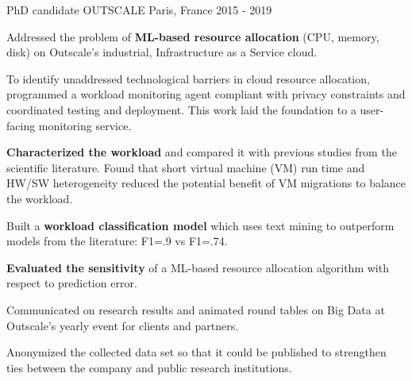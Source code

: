 
\begin{cventries}
  \cventry
  {PhD candidate} 
  {OUTSCALE}
  {Paris, France} %
  {2015 - 2019} %
    {
      \begin{cvitems} %
      \item {Addressed the problem of \textbf{ML-based resource allocation} (CPU, memory, disk) on Outscale's industrial, Infrastructure as a Service cloud.}
      \item{To identify unaddressed technological barriers in cloud resource allocation, programmed a workload monitoring agent compliant with privacy constraints and coordinated testing and deployment. This work laid the foundation to a user-facing monitoring service.}
      \item{\textbf{Characterized the workload} and compared it with previous studies from the scientific literature. Found that short virtual machine (VM) run time and HW/SW heterogeneity reduced the potential benefit of VM migrations to balance the workload.}
      \item{Built a \textbf{workload classification model} which uses text mining to outperform models from the literature: F1=.9 vs F1=.74.} 
      \item{\textbf{Evaluated the sensitivity} of a ML-based resource allocation algorithm with respect to prediction error.}
      \item{Communicated on research results and animated round tables on Big Data at Outscale's yearly event for clients and partners.}
      \item{Anonymized the collected data set so that it could be published to strengthen ties between the company and public research institutions.}
      \end{cvitems}
    }




\end{cventries}
